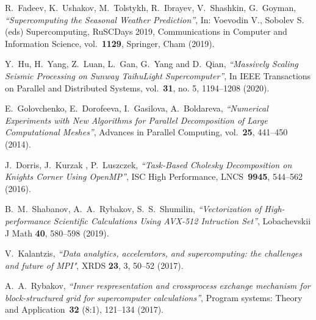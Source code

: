 \documentclass[
11pt,%
tightenlines,%
twoside,%
onecolumn,%
nofloats,%
nobibnotes,%
nofootinbib,%
superscriptaddress,%
noshowpacs,%
centertags]%
{revtex4}
\begin{document}
\begin{thebibliography}{99}


R.~Fadeev, K.~Ushakov, M.~Tolstykh, R.~Ibrayev, V.~Shashkin, G.~Goyman, {\it ``Supercomputing the Seasonal Weather Prediction''}, In: Voevodin V., Sobolev S. (eds) Supercomputing, RuSCDays 2019, Communications in Computer and Information Science, vol.~{\bf 1129}, Springer, Cham (2019).

Y.~Hu, H.~Yang, Z.~Luan, L.~Gan, G.~Yang and D.~Qian, {\it ``Massively Scaling Seismic Processing on Sunway TaihuLight Supercomputer''}, In IEEE Transactions on Parallel and Distributed Systems, vol.~{\bf 31}, no. 5, 1194--1208 (2020).

E.~Golovchenko, E.~Dorofeeva, I.~Gasilova, A.~Boldareva, {\it ``Numerical Experiments with New Algorithms for Parallel Decomposition of Large Computational Meshes''}, Advances in Parallel Computing, vol.~{\bf 25}, 441--450 (2014).

J.~Dorris, J.~Kurzak , P.~Luszczek, {\it ``Task-Based Cholesky Decomposition on Knights Corner Using OpenMP''}, ISC High Performance, LNCS~{\bf 9945}, 544--562 (2016).

B.~M.~Shabanov, A.~A.~Rybakov, S.~S.~Shumilin, {\it ``Vectorization of High-performance Scientific Calculations Using AVX-512 Intruction Set''}, Lobachevskii J Math {\bf 40}, 580--598 (2019).

V.~Kalantzis, {\it ``Data analytics, accelerators, and supercomputing: the challenges and future of MPI"}, XRDS {\bf 23}, 3, 50--52 (2017).




A.~A.~Rybakov, {\it ``Inner respresentation and crossprocess exchange mechanism for block-structured grid for supercomputer calculations''}, Program systems: Theory and Application~{\bf 32} (8:1), 121--134 (2017).



\end{thebibliography}
\end{document}
